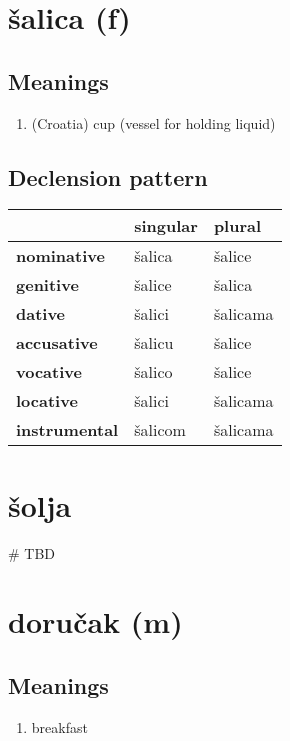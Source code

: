 \filbreak
\section{šalica (f)}
\subsection*{Meanings}
\begin{enumerate}
\item (Croatia) cup (vessel for holding liquid)
\end{enumerate}
\subsection*{Declension pattern}
\begin{tabularx}{\linewidth}{Xll}
\toprule
{} & singular &    plural \\
\midrule
\textbf{nominative  } &   šalica &    šalice \\
\textbf{genitive    } &   šalice &    šalica \\
\textbf{dative      } &   šalici &  šalicama \\
\textbf{accusative  } &   šalicu &    šalice \\
\textbf{vocative    } &   šalico &    šalice \\
\textbf{locative    } &   šalici &  šalicama \\
\textbf{instrumental} &  šalicom &  šalicama \\
\bottomrule
\end{tabularx}

\filbreak
\section{šolja}
{\# TBD}
\section{doručak (m)}
\subsection*{Meanings}
\begin{enumerate}
\item breakfast
\end{enumerate}
